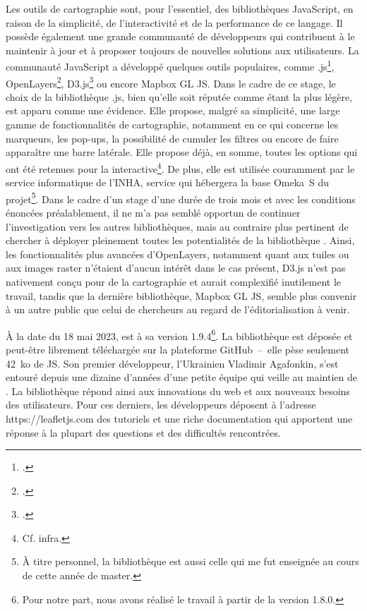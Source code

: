 Les outils de cartographie sont, pour l’essentiel, des bibliothèques JavaScript, en raison de la simplicité, de l’interactivité et de la performance de ce langage. Il possède également une grande communauté de développeurs qui contribuent à le maintenir à jour et à proposer toujours de nouvelles solutions aux utilisateurs. La communauté JavaScript a développé quelques outils populaires, comme .js\footcite{agafonkin_leaflet_nodate}, OpenLayers\footcite{noauthor_openlayers_nodate}, D3.js\footcite{noauthor_d3_nodate} ou encore Mapbox GL JS. Dans le cadre de ce stage, le choix de la bibliothèque .js, bien qu’elle soit réputée comme étant la plus légère, est apparu comme une évidence. Elle propose, malgré sa simplicité, une large gamme de fonctionnalités de cartographie, notamment en ce qui concerne les marqueurs, les pop-ups, la possibilité de cumuler les filtres ou encore de faire apparaître une barre latérale. Elle propose déjà, en somme, toutes les options qui ont été retenues pour la  interactive\footnote{Cf. infra.}. De plus, elle est utilisée couramment par le service informatique de l’INHA, service qui hébergera la base Omeka~S du projet\footnote{À titre personnel, la bibliothèque  est aussi celle qui me fut enseignée au cours de cette année de master.}. Dans le cadre d’un stage d’une durée de trois mois et avec les conditions énoncées préalablement, il ne m’a pas semblé opportun de continuer l’investigation vers les autres bibliothèques, mais au contraire plus pertinent de chercher à déployer pleinement toutes les potentialités de la bibliothèque . Ainsi, les fonctionnalités plus avancées d’OpenLayers, notamment quant aux tuiles ou aux images raster n’étaient d’aucun intérêt dans le cas présent, D3.js n’est pas nativement conçu pour de la cartographie et aurait complexifié inutilement le travail, tandis que la dernière bibliothèque, Mapbox GL JS, semble plus convenir à un autre public que celui de chercheurs au regard de l’éditorialisation à venir.\\\par
À la date du 18 mai 2023,  est à sa version 1.9.4\footnote{Pour notre part, nous avons réalisé le travail à partir de la version 1.8.0.}. La bibliothèque est déposée et peut-être librement téléchargée sur la plateforme GitHub~–~elle pèse seulement 42~ko de JS. Son premier développeur, l’Ukrainien Vladimir Agafonkin, s’est entouré depuis une dizaine d’années d’une petite équipe qui veille au maintien de . La bibliothèque répond ainsi aux innovations du web et aux nouveaux besoins des utilisateurs. Pour ces derniers, les développeurs déposent à l’adresse https://leafletjs.com des tutoriels et une riche documentation qui apportent une réponse à la plupart des questions et des difficultés rencontrées.\par
